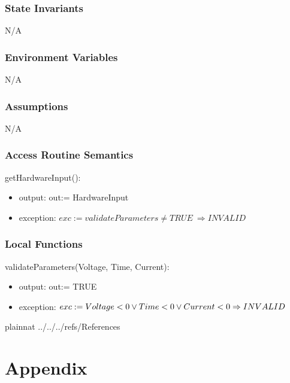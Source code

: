 \documentclass[12pt, titlepage]{article}
\begin{document}
\subsubsection{State Invariants}
N/A

\subsubsection{Environment Variables}

N/A

\subsubsection{Assumptions}
N/A

\subsubsection{Access Routine Semantics}

\noindent getHardwareInput():
\begin{itemize}
\item output: out:= HardwareInput
\item exception: $exc:= 
validateParameters \ne TRUE \
\Rightarrow INVALID$
\end{itemize}


\subsubsection{Local Functions}
\noindent validateParameters(Voltage, Time, Current):
\begin{itemize}
\item output: out:= TRUE
\item exception: $exc:= 
Voltage < 0 \lor \\
Time < 0 \lor Current < 0 \\
\Rightarrow INVALID$
\end{itemize}
\newpage

 {plainnat}
 {../../../refs/References}

\newpage

\section{Appendix} \label{Appendix}

\end{document}
